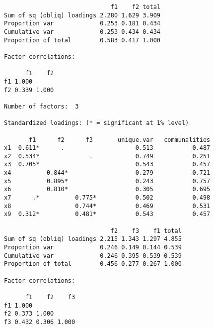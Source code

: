 \begin{verbatim}
                              f1    f2 total
Sum of sq (obliq) loadings 2.280 1.629 3.909
Proportion var             0.253 0.181 0.434
Cumulative var             0.253 0.434 0.434
Proportion of total        0.583 0.417 1.000

Factor correlations:

      f1    f2
f1 1.000      
f2 0.339 1.000

Number of factors:  3 

Standardized loadings: (* = significant at 1% level)

       f1      f2      f3       unique.var   communalities
x1  0.611*      .                    0.513           0.487
x2  0.534*              .            0.749           0.251
x3  0.705*                           0.543           0.457
x4          0.844*                   0.279           0.721
x5          0.895*                   0.243           0.757
x6          0.810*                   0.305           0.695
x7      .*          0.775*           0.502           0.498
x8                  0.744*           0.469           0.531
x9  0.312*          0.481*           0.543           0.457

                              f2    f3    f1 total
Sum of sq (obliq) loadings 2.215 1.343 1.297 4.855
Proportion var             0.246 0.149 0.144 0.539
Cumulative var             0.246 0.395 0.539 0.539
Proportion of total        0.456 0.277 0.267 1.000

Factor correlations:

      f1    f2    f3
f1 1.000            
f2 0.373 1.000      
f3 0.432 0.306 1.000
\end{verbatim}
